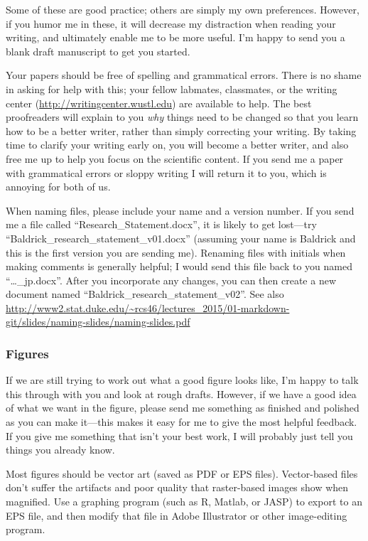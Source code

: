 \documentclass[letterpaper,12pt,oneside]{memoir}
\begin{document}
Some of these are  good practice; others are simply my own preferences. However, if you humor me in these, it will decrease my distraction when reading your writing, and ultimately enable me to be more useful. I'm happy to send you a blank draft manuscript to get you started.

Your papers should be free of spelling and grammatical errors. There is no shame in asking for help with this; your fellow labmates, classmates, or the writing center (\url{http://writingcenter.wustl.edu}) are available to help. The best proofreaders will explain to you \textit{why} things need to be changed so that you learn how to be a better writer, rather than simply correcting your writing. By taking time to clarify your writing early on, you will become a better writer, and also free me up to help you focus on the scientific content. If you send me a paper with grammatical errors or sloppy writing I will return it to you, which is annoying for both of us.


\begin{shaded}
\noindent When naming files, please include your name and a version number. If you send me a file called ``Research\_Statement.docx'', it is likely to get lost---try ``Baldrick\_research\_statement\_v01.docx'' (assuming your name is Baldrick and this is the first version you are sending me). Renaming files with initials when making comments is generally helpful; I would send this file back to you named ``\ldots\_jp.docx''. After you incorporate any changes, you can then create a new document named ``Baldrick\_research\_statement\_v02''. See also \url{http://www2.stat.duke.edu/~rcs46/lectures_2015/01-markdown-git/slides/naming-slides/naming-slides.pdf}
\end{shaded}

\subsubsection{Figures}
If we are still trying to work out what a good figure looks like, I'm happy to talk this through with you and look at rough drafts. However, if we have a good idea of what we want in the figure, please send me something as finished and polished as you can make it---this makes it easy for me to give the most helpful feedback. If you give me something that isn't your best work, I will probably just tell you things you already know.

Most figures should be vector art (saved as PDF or EPS files). Vector-based files don't suffer the artifacts and poor quality that raster-based images show when magnified. Use a graphing program (such as R, Matlab, or JASP) to export to an EPS file, and then modify that file in Adobe Illustrator or other image-editing program.
\end{document}
